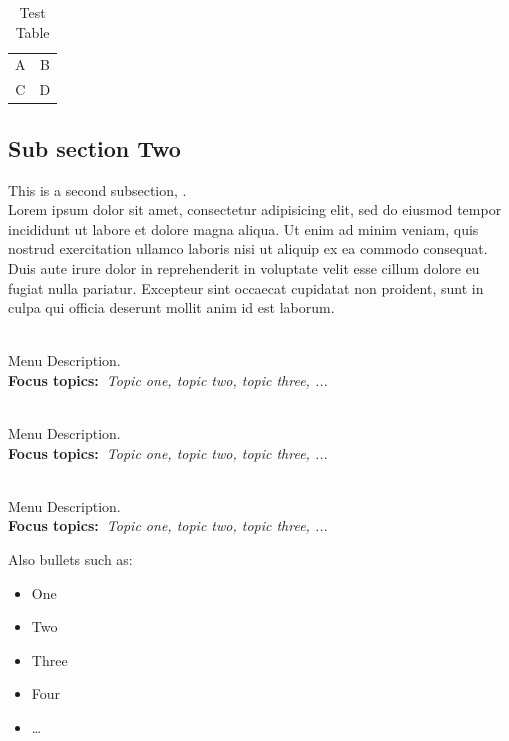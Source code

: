 \documentclass[a4paper, oneside, frenchb]{report}
\begin{document}
\begin{table}
\begin{tabular}{cc}
A & B \\
C & D
\end{tabular}
\caption{Test Table}
\end{table}

 \subsection{Sub section Two}

  This is a second subsection\cite{gen1972}, \cite{schaeffer99}. ~\\
  Lorem ipsum dolor sit amet, consectetur adipisicing elit, sed do eiusmod
  tempor incididunt ut labore et dolore magna aliqua. Ut enim ad minim veniam,
  quis nostrud exercitation ullamco laboris nisi ut aliquip ex ea commodo
  consequat. Duis aute irure dolor in reprehenderit in voluptate velit esse
  cillum dolore eu fugiat nulla pariatur. Excepteur sint occaecat cupidatat non
  proident, sunt in culpa qui officia deserunt mollit anim id est laborum.

  \begin{description}\addtolength{\itemsep}{-0.35\baselineskip}%
    \item[\textbullet~\bfseries Menu Item] \hfill \\%
      Menu Description.~\\%
      {\textbf{Focus topics:~}\emph{Topic one, topic two, topic three, ...}}%
    \item[\textbullet~\bfseries Menu Item] \hfill \\%
      Menu Description.~\\%
      {\textbf{Focus topics:~}\emph{Topic one, topic two, topic three, ...}}%
    \item[\textbullet~\bfseries Menu Item] \hfill \\%
      Menu Description.~\\%
      {\textbf{Focus topics:~}\emph{Topic one, topic two, topic three, ...}}%
  \end{description}

  Also bullets such as:%
  \begin{itemize}\addtolength{\itemsep}{-0.35\baselineskip}%
    \item One%
    \item Two%
    \item Three%
    \item Four%
    \item \ldots%
  \end{itemize}%
\end{document}
